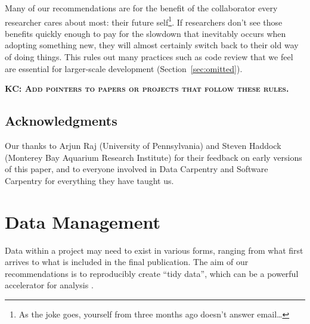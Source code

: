 \documentclass[10pt]{article}
\newcommand{\fixme}[2]{\textsc{\textbf{{#1}: {#2}}}}
\begin{document}
Many of our recommendations are for the benefit of the collaborator
every researcher cares about most: their future self\footnote{As the
  joke goes, yourself from three months ago doesn't answer
  email{\ldots}}. If researchers don't see those benefits quickly
enough to pay for the slowdown that inevitably occurs when adopting
something new, they will almost certainly switch back to their old way
of doing things.  This rules out many practices such as code review
that we feel are essential for larger-scale development
(Section~\ref{sec:omitted}).

\fixme{KC}{Add pointers to papers or projects that follow these rules.}

\subsection*{Acknowledgments}

Our thanks to Arjun Raj (University of Pennsylvania) and Steven
Haddock (Monterey Bay Aquarium Research Institute) for their feedback
on early versions of this paper, and to everyone involved in Data
Carpentry and Software Carpentry for everything they have taught us.

\section{Data Management}\label{sec:data}

Data within a project may need to exist in various forms, ranging from what
first arrives to what is included in the final publication.  The aim of
our recommendations is to reproducibly create ``tidy data'', which can be a
powerful accelerator for analysis \cite{wickham2014,hart2015}.
\end{document}
